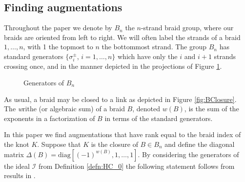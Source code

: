 \documentclass[11pt]{amsart}
\begin{document}
\subsection{Finding augmentations}
\label{SecBG_AugExist}
  Throughout the paper we denote by $B_n$ the $n$-strand braid group, where our braids are oriented from left to right. We will often label the strands of a braid $1,\ldots, n$, with 1 the topmost to $n$ the bottommost strand. The group $B_n$ has standard generators $\{\sigma_i^{\pm}$, $i=1,\ldots,n\}$ which have only the $i$ and $i+1$ strands crossing once, and in the manner depicted in the projections of Figure \ref{fig:BraidGens}.
    \begin{figure}[ht]
      \caption{Generators of $B_n$}
      \label{fig:BraidGens}
    \end{figure}
  As usual, a braid may be closed to a link as depicted in Figure \ref{fig:BClosure}. The {\emph writhe} (or algebraic sum) of a braid $B$, denoted $w(B)$, is the sum of the exponents in a factorization of $B$ in terms of the standard generators.

  In this paper we find augmentations that have rank equal to the braid index of the knot $K$. Suppose that $K$ is the closure of $B\in B_n$ and define the diagonal matrix $\Delta(B)=\text{diag}[(-1)^{w(B)},1,\ldots,1]$. By considering the generators of the ideal $\mathcal I$ from Definition \ref{defn:HC_0} the following statement follows from results in \cite[Section 5]{Cor13b}.
\end{document}
